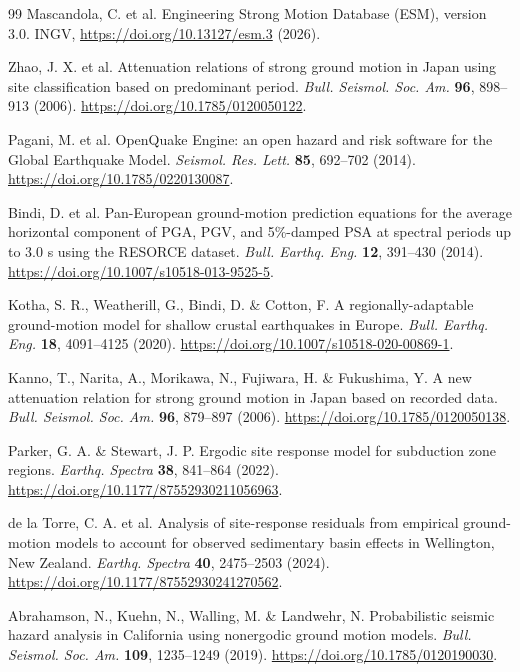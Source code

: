 \documentclass[11pt]{article}
\begin{document}
\begin{thebibliography}{99}
 Mascandola, C. et al. Engineering Strong Motion Database (ESM), version 3.0. INGV, \url{https://doi.org/10.13127/esm.3} (2026).

 Zhao, J. X. et al. Attenuation relations of strong ground motion in Japan using site classification based on predominant period. \textit{Bull. Seismol. Soc. Am.} \textbf{96}, 898--913 (2006). \url{https://doi.org/10.1785/0120050122}.

 Pagani, M. et al. OpenQuake Engine: an open hazard and risk software for the Global Earthquake Model. \textit{Seismol. Res. Lett.} \textbf{85}, 692--702 (2014). \url{https://doi.org/10.1785/0220130087}.

 Bindi, D. et al. Pan-European ground-motion prediction equations for the average horizontal component of PGA, PGV, and 5\%-damped PSA at spectral periods up to 3.0 s using the RESORCE dataset. \textit{Bull. Earthq. Eng.} \textbf{12}, 391--430 (2014). \url{https://doi.org/10.1007/s10518-013-9525-5}.

 Kotha, S. R., Weatherill, G., Bindi, D. \& Cotton, F. A regionally-adaptable ground-motion model for shallow crustal earthquakes in Europe. \textit{Bull. Earthq. Eng.} \textbf{18}, 4091--4125 (2020). \url{https://doi.org/10.1007/s10518-020-00869-1}.

 Kanno, T., Narita, A., Morikawa, N., Fujiwara, H. \& Fukushima, Y. A new attenuation relation for strong ground motion in Japan based on recorded data. \textit{Bull. Seismol. Soc. Am.} \textbf{96}, 879--897 (2006). \url{https://doi.org/10.1785/0120050138}.

 Parker, G. A. \& Stewart, J. P. Ergodic site response model for subduction zone regions. \textit{Earthq. Spectra} \textbf{38}, 841--864 (2022). \url{https://doi.org/10.1177/87552930211056963}.

 de la Torre, C. A. et al. Analysis of site-response residuals from empirical ground-motion models to account for observed sedimentary basin effects in Wellington, New Zealand. \textit{Earthq. Spectra} \textbf{40}, 2475--2503 (2024). \url{https://doi.org/10.1177/87552930241270562}.

 Abrahamson, N., Kuehn, N., Walling, M. \& Landwehr, N. Probabilistic seismic hazard analysis in California using nonergodic ground motion models. \textit{Bull. Seismol. Soc. Am.} \textbf{109}, 1235--1249 (2019). \url{https://doi.org/10.1785/0120190030}.


\end{thebibliography}
\end{document}
